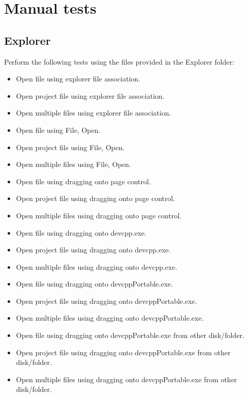 \clearpage
\section{Manual tests}
\subsection{Explorer}
Perform the following tests using the files provided in the Explorer folder:
\begin{itemize}
    \item Open file using explorer file association.
    \item Open project file using explorer file association.
    \item Open multiple files using explorer file association.
    
    \item Open file using File, Open.
    \item Open project file using File, Open.
    \item Open multiple files using File, Open.
    
    \item Open file using dragging onto page control.
    \item Open project file using dragging onto page control.
    \item Open multiple files using dragging onto page control.
    
    \item Open file using dragging onto devcpp.exe.
    \item Open project file using dragging onto devcpp.exe.
    \item Open multiple files using dragging onto devcpp.exe.
    
    \item Open file using dragging onto devcppPortable.exe.
    \item Open project file using dragging onto devcppPortable.exe.
    \item Open multiple files using dragging onto devcppPortable.exe.
    
    \item Open file using dragging onto devcppPortable.exe from other disk/folder.
    \item Open project file using dragging onto devcppPortable.exe from other disk/folder.
    \item Open multiple files using dragging onto devcppPortable.exe from other disk/folder.
\end{itemize}

